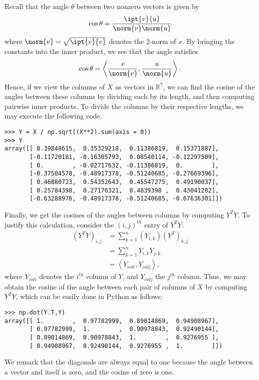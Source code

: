 Recall that the angle $\theta$ between two nonzero
vectors is given by
\[
\cos{\theta} = \frac{\ipt{v}{u}}{\norm{v}\norm{u}}
\]
where $\norm{v} = \sqrt{\ipt{v}{v}}$ denotes the 2-norm of $x$.
By bringing the constants into the inner product, we see that the angle satisfies
\[
\cos{\theta} = \left\langle\frac{v}{\norm{v}},\frac{u}{\norm{u}}\right\rangle.
\]
Hence, if we view the columns of $X$ as vectors in $\mathbb{R}^7$, we can find the cosine of the angles between these columns by dividing each
by its length, and then computing pairwise inner products. To divide the columns by their respective lengths, we may execute the following
code.
\begin{lstlisting}
>>> Y = X / np.sqrt((X**2).sum(axis = 0))
>>> Y
array([[ 0.39848615,  0.35329218,  0.11386819,  0.15371887],
       [-0.11720181, -0.16305793,  0.08540114, -0.12297509],
       [ 0.        , -0.02717632, -0.11386819,  0.        ],
       [-0.37504578, -0.48917378, -0.51240685, -0.27669396],
       [ 0.46880723,  0.54352643,  0.45547275,  0.49190037],
       [ 0.25784398,  0.27176321,  0.4839398 ,  0.43041282],
       [-0.63288976, -0.48917378, -0.51240685, -0.67636301]])
\end{lstlisting}

Finally, we get the cosines of the angles between columns by computing $Y^T Y$. To justify this calculation, consider
the $(i,j)^{th}$ entry of $Y^T Y$:
\begin{align*}
(Y^T Y)_{i,j} &= \sum_{k=1}^n (Y_{i,k})(Y^T)_{k,j} \\
&= \sum_{k=1}^n Y_{i,k}Y_{j,k} \\
&= \left\langle Y_{col i}, Y_{col j} \right\rangle,
\end{align*}
where $Y_{col i}$ denotes the $i^{th}$ column of $Y$, and $Y_{col j}$ the $j^{th}$ column.
Thus, we may obtain the cosine of the angle between each pair of columns of $X$ by computing $Y^T Y$,
which can be easily done in Python as follows:
\begin{lstlisting}
>>> np.dot(Y.T,Y)
array([[ 1.        ,  0.97782999,  0.89014869,  0.94908967],
       [ 0.97782999,  1.        ,  0.90978843,  0.92490144],
       [ 0.89014869,  0.90978843,  1.        ,  0.9276955 ],
       [ 0.94908967,  0.92490144,  0.9276955 ,  1.        ]])
\end{lstlisting}

We remark that the diagonals are always equal to one because the angle between a vector and itself is zero, and the cosine of zero is one.

